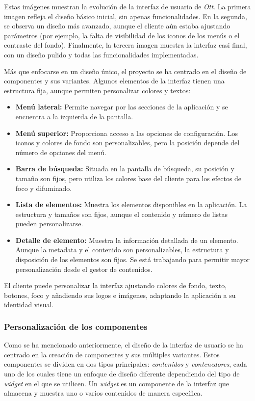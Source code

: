 Estas imágenes muestran la evolución de la interfaz de usuario de \textit{Ott}. La primera imagen refleja el diseño básico inicial, 
sin apenas funcionalidades. En la segunda, se observa un diseño más avanzado, aunque el cliente aún estaba ajustando parámetros (por ejemplo, 
la falta de visibilidad de los iconos de los menús o el contraste del fondo). Finalmente, la tercera imagen muestra la interfaz casi 
final, con un diseño pulido y todas las funcionalidades implementadas.

Más que enfocarse en un diseño único, el proyecto se ha centrado en el diseño de componentes y sus variantes. Algunos elementos de 
la interfaz tienen una estructura fija, aunque permiten personalizar colores y textos:

\begin{itemize}
    \item \textbf{Menú lateral:} Permite navegar por las secciones de la aplicación y se encuentra a la izquierda de la pantalla.
    \item \textbf{Menú superior:} Proporciona acceso a las opciones de configuración. Los iconos y colores de fondo son personalizables, pero la posición depende del número de opciones del menú.
    \item \textbf{Barra de búsqueda:} Situada en la pantalla de búsqueda, su posición y tamaño son fijos, pero utiliza los colores base del cliente para los efectos de foco y difuminado.
    \item \textbf{Lista de elementos:} Muestra los elementos disponibles en la aplicación. La estructura y tamaños son fijos, aunque el contenido y número de listas pueden personalizarse.
    \item \textbf{Detalle de elemento:} Muestra la información detallada de un elemento. Aunque la metadata y el contenido son personalizables, la estructura y disposición de los elementos son fijos. Se está trabajando para permitir mayor personalización desde el gestor de contenidos.
\end{itemize}

El cliente puede personalizar la interfaz ajustando colores de fondo, texto, botones, foco y añadiendo sus logos e imágenes, adaptando la 
aplicación a su identidad visual.
\subsubsection{Personalización de los componentes}
\label{sec:diseno-ux-personalizacion}

Como se ha mencionado anteriormente, el diseño de la interfaz de usuario se ha centrado en la creación de componentes y sus múltiples variantes. 
Estos componentes se dividen en dos tipos principales: \textit{contenidos} y \textit{contenedores}, cada uno de los cuales tiene un enfoque de 
diseño diferente dependiendo del tipo de \textit{widget} en el que se utilicen. Un \textit{widget} es un componente de la interfaz que almacena y 
muestra uno o varios contenidos de manera específica.

